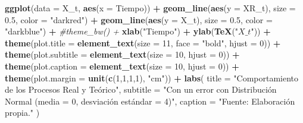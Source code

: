 \documentclass[
]{book}
\newenvironment{Shaded}{\begin{snugshade}}{\end{snugshade}}
\newcommand{\AttributeTok}[1]{\textcolor[rgb]{0.13,0.29,0.53}{#1}}
\newcommand{\CommentTok}[1]{\textcolor[rgb]{0.56,0.35,0.01}{\textit{#1}}}
\newcommand{\DecValTok}[1]{\textcolor[rgb]{0.00,0.00,0.81}{#1}}
\newcommand{\FloatTok}[1]{\textcolor[rgb]{0.00,0.00,0.81}{#1}}
\newcommand{\FunctionTok}[1]{\textcolor[rgb]{0.13,0.29,0.53}{\textbf{#1}}}
\newcommand{\NormalTok}[1]{#1}
\newcommand{\SpecialCharTok}[1]{\textcolor[rgb]{0.81,0.36,0.00}{\textbf{#1}}}
\newcommand{\StringTok}[1]{\textcolor[rgb]{0.31,0.60,0.02}{#1}}
\begin{document}
\begin{Shaded}
\begin{Highlighting}[]
\FunctionTok{ggplot}\NormalTok{(}\AttributeTok{data =}\NormalTok{ X\_t, }\FunctionTok{aes}\NormalTok{(}\AttributeTok{x =}\NormalTok{ Tiempo)) }\SpecialCharTok{+}
  \FunctionTok{geom\_line}\NormalTok{(}\FunctionTok{aes}\NormalTok{(}\AttributeTok{y =}\NormalTok{ XR\_t), }\AttributeTok{size =} \FloatTok{0.5}\NormalTok{, }\AttributeTok{color =} \StringTok{"darkred"}\NormalTok{) }\SpecialCharTok{+}
  \FunctionTok{geom\_line}\NormalTok{(}\FunctionTok{aes}\NormalTok{(}\AttributeTok{y =}\NormalTok{ X\_t), }\AttributeTok{size =} \FloatTok{0.5}\NormalTok{, }\AttributeTok{color =} \StringTok{"darkblue"}\NormalTok{) }\SpecialCharTok{+}
  \CommentTok{\#theme\_bw() + }
  \FunctionTok{xlab}\NormalTok{(}\StringTok{"Tiempo"}\NormalTok{) }\SpecialCharTok{+} 
  \FunctionTok{ylab}\NormalTok{(}\FunctionTok{TeX}\NormalTok{(}\StringTok{"$X\_t$"}\NormalTok{)) }\SpecialCharTok{+} 
  \FunctionTok{theme}\NormalTok{(}\AttributeTok{plot.title =} \FunctionTok{element\_text}\NormalTok{(}\AttributeTok{size =} \DecValTok{11}\NormalTok{, }\AttributeTok{face =} \StringTok{"bold"}\NormalTok{, }
                                  \AttributeTok{hjust =} \DecValTok{0}\NormalTok{)) }\SpecialCharTok{+} 
  \FunctionTok{theme}\NormalTok{(}\AttributeTok{plot.subtitle =} \FunctionTok{element\_text}\NormalTok{(}\AttributeTok{size =} \DecValTok{10}\NormalTok{, }\AttributeTok{hjust =} \DecValTok{0}\NormalTok{)) }\SpecialCharTok{+} 
  \FunctionTok{theme}\NormalTok{(}\AttributeTok{plot.caption =} \FunctionTok{element\_text}\NormalTok{(}\AttributeTok{size =} \DecValTok{10}\NormalTok{, }\AttributeTok{hjust =} \DecValTok{0}\NormalTok{)) }\SpecialCharTok{+}
  \FunctionTok{theme}\NormalTok{(}\AttributeTok{plot.margin =} \FunctionTok{unit}\NormalTok{(}\FunctionTok{c}\NormalTok{(}\DecValTok{1}\NormalTok{,}\DecValTok{1}\NormalTok{,}\DecValTok{1}\NormalTok{,}\DecValTok{1}\NormalTok{), }\StringTok{"cm"}\NormalTok{)) }\SpecialCharTok{+}
  \FunctionTok{labs}\NormalTok{(}
    \AttributeTok{title =} \StringTok{"Comportamiento de los Procesos Real y Teórico"}\NormalTok{,}
    \AttributeTok{subtitle =} \StringTok{"Con un error con Distribución Normal (media = 0, desviación estándar = 4)"}\NormalTok{,}
    \AttributeTok{caption =} \StringTok{"Fuente: Elaboración propia."}
\NormalTok{  )}
\end{Highlighting}
\end{Shaded}
\end{document}
